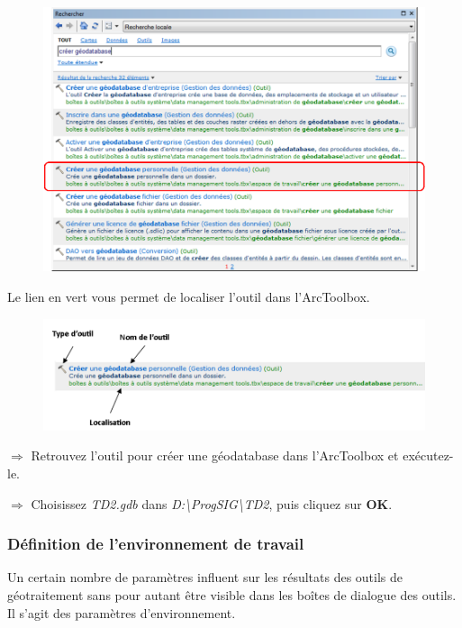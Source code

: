 \documentclass[11pt]{article}
\newcommand{\action}{$\Rightarrow$ }
\begin{document}
\begin{figure}[H]
	\center \includegraphics{img/td3/arctoolbox_recherche.png}\\
\end{figure}

Le lien en vert vous permet de localiser l'outil dans l'ArcToolbox.

\begin{figure}[H]
	\center \includegraphics{img/td3/arctoolbox_recherche-2.png}\\
\end{figure}

\action Retrouvez l'outil pour créer une géodatabase dans l'ArcToolbox et exécutez-le.

\action Choisissez \textit{TD2.gdb} dans \textit{D:\textbackslash{}ProgSIG\textbackslash{}TD2}, puis cliquez sur \textbf{OK}.


\subsubsection{Définition de l'environnement de travail}
Un certain nombre de paramètres influent sur les résultats des outils de géotraitement sans pour autant être visible dans les boîtes de dialogue des outils. Il s'agit des paramètres d'environnement.
\end{document}
